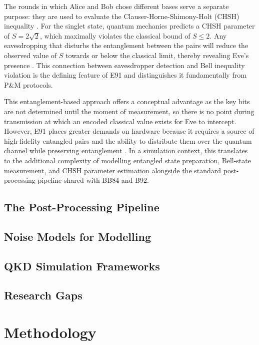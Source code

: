 \documentclass[10pt, a4paper]{report}
\begin{document}
The rounds in which Alice and Bob chose different bases serve a separate purpose: they are used to evaluate the Clauser-Horne-Shimony-Holt (CHSH) inequality \cite{QKDbible}. For the singlet state, quantum mechanics predicts a CHSH parameter of $S = 2\sqrt{2}$, which maximally violates the classical bound of $S \leq 2$. Any eavesdropping that disturbs the entanglement between the pairs will reduce the observed value of $S$ towards or below the classical limit, thereby revealing Eve's presence \cite{ekertQI, E91}. This connection between eavesdropper detection and Bell inequality violation is the defining feature of E91 and distinguishes it fundamentally from P\&M protocols.

This entanglement-based approach offers a conceptual advantage as the key bits are not determined until the moment of measurement, so there is no point during transmission at which an encoded classical value exists for Eve to intercept. However, E91 places greater demands on hardware because it requires a source of high-fidelity entangled pairs and the ability to distribute them over the quantum channel while preserving entanglement \cite{ekertQI}. In a simulation context, this translates to the additional complexity of modelling entangled state preparation, Bell-state measurement, and CHSH parameter estimation alongside the standard post-processing pipeline shared with BB84 and B92.



\section{The Post-Processing Pipeline}

\section{Noise Models for Modelling} 

\section{QKD Simulation Frameworks}

\section{Research Gaps}

\chapter{Methodology}
\end{document}
